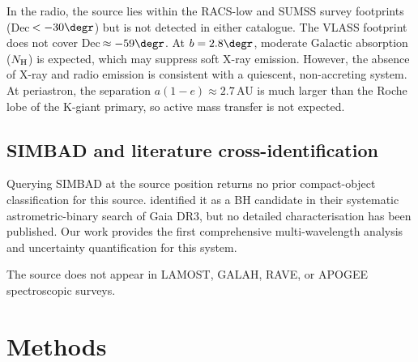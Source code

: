 \documentclass[usenatbib,fleqn]{mnras}
\begin{document}
In the radio, the source lies within the RACS-low and SUMSS
survey footprints (Dec$\,< -30\degr$) but is not detected in
either catalogue.  The VLASS footprint does not cover
Dec$\,\approx -59\degr$.
At $b = 2.8\degr$, moderate Galactic absorption ($N_{\rm H}$) is
expected, which may suppress soft X-ray emission.  However, the
absence of X-ray and radio emission is consistent with a quiescent,
non-accreting system.  At periastron, the separation
$a(1-e) \approx 2.7$\,AU is much larger than the Roche lobe of
the K-giant primary, so active mass transfer is not expected.

\subsection{SIMBAD and literature cross-identification}
\label{sec:data:simbad}

Querying SIMBAD \citep{Wenger2000} at the source position returns
no prior compact-object classification for this source.
\citet{Tanikawa2023} identified it as a BH candidate in their
systematic astrometric-binary search of Gaia DR3, but no detailed
characterisation has been published.  Our work provides the first
comprehensive multi-wavelength analysis and uncertainty
quantification for this system.

The source does not appear in LAMOST, GALAH, RAVE, or APOGEE
spectroscopic surveys.

\section{Methods}
\label{sec:methods}

\noindent{}
\medskip
\end{document}

